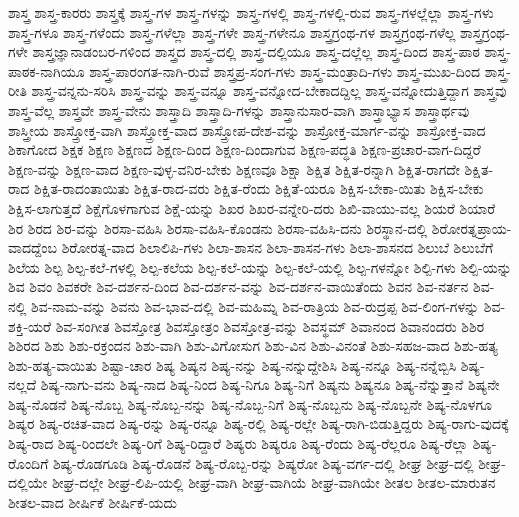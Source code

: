 {ಶಾಸ್ತ್ರ
ಶಾಸ್ತ್ರ-ಕಾರರು
ಶಾಸ್ತ್ರಕ್ಕೆ
ಶಾಸ್ತ್ರ-ಗಳ
ಶಾಸ್ತ್ರ-ಗಳನ್ನು
ಶಾಸ್ತ್ರ-ಗಳಲ್ಲಿ
ಶಾಸ್ತ್ರ-ಗಳಲ್ಲಿ-ರುವ
ಶಾಸ್ತ್ರ-ಗಳಲ್ಲೆಲ್ಲಾ
ಶಾಸ್ತ್ರ-ಗಳು
ಶಾಸ್ತ್ರ-ಗಳೂ
ಶಾಸ್ತ್ರ-ಗಳೆಂದು
ಶಾಸ್ತ್ರ-ಗಳೆಲ್ಲಾ
ಶಾಸ್ತ್ರ-ಗಳೇ
ಶಾಸ್ತ್ರ-ಗಳೇನೂ
ಶಾಸ್ತ್ರಗ್ರಂಥ-ಗಳ
ಶಾಸ್ತ್ರಗ್ರಂಥ-ಗಳೆಲ್ಲ
ಶಾಸ್ತ್ರಗ್ರಂಥ-ಗಳೇ
ಶಾಸ್ತ್ರಜ್ಞಾನಾಡಂಬರ-ಗಳಿಂದ
ಶಾಸ್ತ್ರದ
ಶಾಸ್ತ್ರ-ದಲ್ಲಿ
ಶಾಸ್ತ್ರ-ದಲ್ಲಿಯೂ
ಶಾಸ್ತ್ರ-ದಲ್ಲೆಲ್ಲ
ಶಾಸ್ತ್ರ-ದಿಂದ
ಶಾಸ್ತ್ರ-ಪಾಠ
ಶಾಸ್ತ್ರ-ಪಾಠಕ-ನಾಗಿಯೂ
ಶಾಸ್ತ್ರ-ಪಾರಂಗತ-ನಾಗಿ-ರುವೆ
ಶಾಸ್ತ್ರಪ್ರ-ಸಂಗ-ಗಳು
ಶಾಸ್ತ್ರ-ಮಂತ್ರಾದಿ-ಗಳು
ಶಾಸ್ತ್ರ-ಮುಖ-ದಿಂದ
ಶಾಸ್ತ್ರ-ರೀತಿ
ಶಾಸ್ತ್ರ-ವನ್ನನು-ಸರಿಸಿ
ಶಾಸ್ತ್ರ-ವನ್ನು
ಶಾಸ್ತ್ರ-ವನ್ನೂ
ಶಾಸ್ತ್ರ-ವನ್ನೋದ-ಬೇಕಾದದ್ದಿಲ್ಲ
ಶಾಸ್ತ್ರ-ವನ್ನೋದುತ್ತಿದ್ದಾಗ
ಶಾಸ್ತ್ರವು
ಶಾಸ್ತ್ರ-ವೆಲ್ಲ
ಶಾಸ್ತ್ರವೇ
ಶಾಸ್ತ್ರ-ವೇನು
ಶಾಸ್ತ್ರಾದಿ
ಶಾಸ್ತ್ರಾದಿ-ಗಳನ್ನು
ಶಾಸ್ತ್ರಾನುಸಾರ-ವಾಗಿ
ಶಾಸ್ತ್ರಾಭ್ಯಾಸ
ಶಾಸ್ತ್ರಾರ್ಥವು
ಶಾಸ್ತ್ರೀಯ
ಶಾಸ್ತ್ರೋಕ್ತ-ವಾಗಿ
ಶಾಸ್ತ್ರೋಕ್ತ-ವಾದ
ಶಾಸ್ತ್ರೋಪ-ದೇಶ-ವನ್ನು
ಶಾಸ್ರೋಕ್ತ-ಮಾರ್ಗ-ವನ್ನು
ಶಾಸ್ರೋಕ್ತ-ವಾದ
ಶಿಕಾಗೋದ
ಶಿಕ್ಷಕ
ಶಿಕ್ಷಣ
ಶಿಕ್ಷಣದ
ಶಿಕ್ಷಣ-ದಿಂದ
ಶಿಕ್ಷಣ-ದಿಂದಾಗುವ
ಶಿಕ್ಷಣ-ಪದ್ಧತಿ
ಶಿಕ್ಷಣ-ಪ್ರಚಾರ-ವಾಗ-ದಿದ್ದರೆ
ಶಿಕ್ಷಣ-ವನ್ನು
ಶಿಕ್ಷಣ-ವಾದ
ಶಿಕ್ಷಣ-ವುಳ್ಳ-ವನಿರ-ಬೇಕು
ಶಿಕ್ಷಣವೂ
ಶಿಕ್ಷಾ
ಶಿಕ್ಷಿತ
ಶಿಕ್ಷಿತ-ರನ್ನಾಗಿ
ಶಿಕ್ಷಿತ-ರಾಗದೇ
ಶಿಕ್ಷಿತ-ರಾದ
ಶಿಕ್ಷಿತ-ರಾದಂತಾಯಿತು
ಶಿಕ್ಷಿತ-ರಾದ-ವರು
ಶಿಕ್ಷಿತ-ರೆಂದು
ಶಿಕ್ಷಿತೆ-ಯರೂ
ಶಿಕ್ಷಿಸ-ಬೇಕಾ-ಯಿತು
ಶಿಕ್ಷಿಸ-ಬೇಕು
ಶಿಕ್ಷಿಸ-ಲಾಗುತ್ತದೆ
ಶಿಕ್ಷೆಗೊಳಗಾಗುವ
ಶಿಕ್ಷೆ-ಯನ್ನು
ಶಿಖರ
ಶಿಖರ-ವನ್ನೇರಿ-ದರು
ಶಿಖಿ-ವಾಯು-ವಲ್ಲ
ಶಿಯರೆ
ಶಿಯಾರೆ
ಶಿರ
ಶಿರದ
ಶಿರ-ವನ್ನು
ಶಿರಸಾ-ವಹಿಸಿ
ಶಿರಸಾ-ವಹಿಸಿ-ಕೊಂಡನು
ಶಿರಸಾ-ವಹಿಸಿ-ದನು
ಶಿರಸ್ಥಾನ-ದಲ್ಲಿ
ಶಿರೋರತ್ನಪ್ರಾಯ-ವಾದದ್ದೆಂಬ
ಶಿರೋರತ್ನ-ವಾದ
ಶಿಲಾಲಿಪಿ-ಗಳು
ಶಿಲಾ-ಶಾಸನ
ಶಿಲಾ-ಶಾಸನ-ಗಳು
ಶಿಲಾ-ಶಾಸನದ
ಶಿಲುಬೆ
ಶಿಲುಬೆಗೆ
ಶಿಲೆಯ
ಶಿಲ್ಪ
ಶಿಲ್ಪ-ಕಲೆ-ಗಳಲ್ಲಿ
ಶಿಲ್ಪ-ಕಲೆಯ
ಶಿಲ್ಪ-ಕಲೆ-ಯನ್ನು
ಶಿಲ್ಪ-ಕಲೆ-ಯಲ್ಲಿ
ಶಿಲ್ಪ-ಗಳನ್ನೋ
ಶಿಲ್ಪಿ-ಗಳು
ಶಿಲ್ಪಿ-ಯನ್ನು
ಶಿವ
ಶಿವಂ
ಶಿವಕರೇ
ಶಿವ-ದರ್ಶನ-ದಿಂದ
ಶಿವ-ದರ್ಶನ-ವನ್ನು
ಶಿವ-ದರ್ಶನ-ವಾಯಿತೆಂದು
ಶಿವನ
ಶಿವ-ನರ್ತನ
ಶಿವ-ನಲ್ಲಿ
ಶಿವ-ನಾಮ-ವನ್ನು
ಶಿವನು
ಶಿವ-ಭಾವ-ದಲ್ಲಿ
ಶಿವ-ಮಹಿಮ್ನ
ಶಿವ-ರಾತ್ರಿಯ
ಶಿವ-ರುದ್ರಪ್ಪ
ಶಿವ-ಲಿಂಗ-ಗಳನ್ನು
ಶಿವ-ಶಕ್ತಿ-ಯರೆ
ಶಿವ-ಸಂಗೀತ
ಶಿವಸ್ತೋತ್ರ
ಶಿವಸ್ತೋತ್ರಂ
ಶಿವಸ್ತೋತ್ರ-ವನ್ನು
ಶಿವಸ್ಥಮ್
ಶಿವಾನಂದ
ಶಿವಾನಂದರು
ಶಿಶಿರ
ಶಿಶಿರದ
ಶಿಶು
ಶಿಶು-ರಕ್ರಂದನ
ಶಿಶು-ವಾಗಿ
ಶಿಶು-ವಿಗೋಸುಗ
ಶಿಶು-ವಿನ
ಶಿಶು-ವಿನಂತೆ
ಶಿಶು-ಸಹಜ-ವಾದ
ಶಿಶು-ಹತ್ಯ
ಶಿಶು-ಹತ್ಯ-ವಾಯಿತು
ಶಿಷ್ಟಾ-ಚಾರ
ಶಿಷ್ಯ
ಶಿಷ್ಯನ
ಶಿಷ್ಯ-ನನ್ನು
ಶಿಷ್ಯ-ನನ್ನುದ್ದೇಶಿಸಿ
ಶಿಷ್ಯ-ನನ್ನೂ
ಶಿಷ್ಯ-ನನ್ನೆಬ್ಬಿಸಿ
ಶಿಷ್ಯ-ನಲ್ಲದೆ
ಶಿಷ್ಯ-ನಾಗು-ವನು
ಶಿಷ್ಯ-ನಾದ
ಶಿಷ್ಯ-ನಿಂದ
ಶಿಷ್ಯ-ನಿಗೂ
ಶಿಷ್ಯ-ನಿಗೆ
ಶಿಷ್ಯನು
ಶಿಷ್ಯನೂ
ಶಿಷ್ಯ-ನೆನ್ನುತ್ತಾನೆ
ಶಿಷ್ಯನೇ
ಶಿಷ್ಯ-ನೊಡನೆ
ಶಿಷ್ಯ-ನೊಬ್ಬ
ಶಿಷ್ಯ-ನೊಬ್ಬ-ನನ್ನು
ಶಿಷ್ಯ-ನೊಬ್ಬ-ನಿಗೆ
ಶಿಷ್ಯ-ನೊಬ್ಬನು
ಶಿಷ್ಯ-ನೊಬ್ಬನೇ
ಶಿಷ್ಯ-ನೊಳಗೂ
ಶಿಷ್ಯರ
ಶಿಷ್ಯ-ರಚಿತ-ವಾದ
ಶಿಷ್ಯ-ರನ್ನು
ಶಿಷ್ಯ-ರನ್ನೂ
ಶಿಷ್ಯ-ರಲ್ಲಿ
ಶಿಷ್ಯ-ರಲ್ಲೇ
ಶಿಷ್ಯ-ರಾಗಿ-ಬಿಡುತ್ತಿದ್ದರು
ಶಿಷ್ಯ-ರಾಗು-ವುದಕ್ಕೆ
ಶಿಷ್ಯ-ರಾದ
ಶಿಷ್ಯ-ರಿಂದಲೇ
ಶಿಷ್ಯ-ರಿಗೆ
ಶಿಷ್ಯ-ರಿದ್ದಾರೆ
ಶಿಷ್ಯರು
ಶಿಷ್ಯರೂ
ಶಿಷ್ಯ-ರೆಂದು
ಶಿಷ್ಯ-ರೆಲ್ಲರೂ
ಶಿಷ್ಯ-ರೆಲ್ಲಾ
ಶಿಷ್ಯ-ರೊಂದಿಗೆ
ಶಿಷ್ಯ-ರೊಡಗೂಡಿ
ಶಿಷ್ಯ-ರೊಡನೆ
ಶಿಷ್ಯ-ರೊಬ್ಬ-ರನ್ನು
ಶಿಷ್ಯರೋ
ಶಿಷ್ಯ-ವರ್ಗ-ದಲ್ಲಿ
ಶೀಘ್ರ
ಶೀಘ್ರ-ದಲ್ಲಿ
ಶೀಘ್ರ-ದಲ್ಲಿಯೇ
ಶೀಘ್ರ-ದಲ್ಲೇ
ಶೀಘ್ರ-ಲಿಪಿ-ಯಲ್ಲಿ
ಶೀಘ್ರ-ವಾಗಿ
ಶೀಘ್ರ-ವಾಗಿಯೆ
ಶೀಘ್ರ-ವಾಗಿಯೇ
ಶೀತಲ
ಶೀತಲ-ಮಾರುತನ
ಶೀತಲ-ವಾದ
ಶೀರ್ಷಿಕೆ
ಶೀರ್ಷಿಕೆ-ಯದು
}
